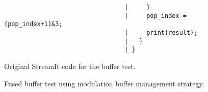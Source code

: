 \begin{figure}[t]
\begin{minipage}{3in}
{\begin{verbatim}
                                 |     }                                         
                                 |     pop_index = (pop_index+1)&3;         
                                 |     print(result);              
                                 |   }                                              
                                 | }
\end{verbatim}}
\end{minipage}
\begin{minipage}{1.5in}
\caption{Original StreamIt code for the buffer test.\protect\label{fig:code-orig}}
\end{minipage}
\hspace{0.3in}
\begin{minipage}{1.5in}
\caption{Fused buffer test using modulation buffer management strategy.\protect\label{fig:code-modulation}}
\end{minipage}
\vspace{-6pt}
\end{figure}
